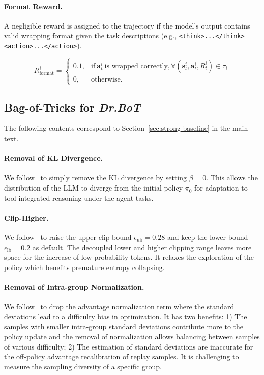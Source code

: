 \documentclass[]{youtu} %
\begin{document}
\paragraph{Format Reward.}
A negligible reward is assigned to the trajectory if the model's output contains valid wrapping format given the task descriptions (e.g., \texttt{<think>...</think><action>...</action>}).

\begin{equation}\label{eq:formatreward}
    R^i_{\text{format}}=\begin{cases}
        0.1, & \text{if}\ \mathbf{a}_{t}^{i}\ \text{is wrapped correctly}, \forall (\mathbf{s}_{t}^{i}, \mathbf{a}_{t}^{i}, R_{t}^{i})\in\tau_i \\
        0, & \text{otherwise}.
    \end{cases}
\end{equation}








\subsection{Bag-of-Tricks for \textit{Dr.BoT}}
\label{sec:botdetails}


The following contents correspond to Section~\ref{sec:strong-baseline} in the main text.


\paragraph{Removal of KL Divergence.}
We follow~\cite{yu2025dapo,liu2025understanding} to simply remove the KL divergence by setting $\beta=0$.
This allows the distribution of the LLM to diverge from the initial policy $\pi_0$ for adaptation to tool-integrated reasoning under the agent tasks.


\paragraph{Clip-Higher.}
We follow~\cite{yu2025dapo} to raise the upper clip bound $\epsilon_{\text{ub}}=0.28$ and keep the lower bound $\epsilon_{\text{lb}}=0.2$ as default.
The decoupled lower and higher clipping range leaves more space for the increase of low-probability tokens.
It relaxes the exploration of the policy which benefits premature entropy collapsing.


\paragraph{Removal of Intra-group Normalization.}
We follow~\cite{liu2025understanding} to drop the advantage normalization term where the standard deviations lead to a difficulty bias in optimization.
It has two benefits:
1) The samples with smaller intra-group standard deviations contribute more to the policy update and the removal of normalization allows balancing between samples of various difficulty;
2) The estimation of standard deviations are inaccurate for the off-policy advantage recalibration of replay samples.
It is challenging to measure the sampling diversity of a specific group.
\end{document}
